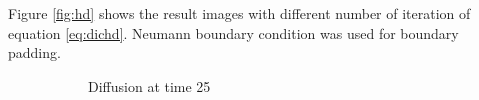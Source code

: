 \documentclass[paper=a4, fontsize=11pt]{scrartcl} %
\numberwithin{equation}{section} %
\numberwithin{figure}{section} %
\numberwithin{table}{section} %
\begin{document}
Figure \ref{fig:hd} shows the result images with different number of iteration of equation \ref{eq:dichd}. Neumann boundary condition was used for boundary padding.

\begin{figure}[H]
	\caption{Denoised image after diffusion\label{fig:hd}}
	\centering
	\begin{subfigure}[b]{0.45\textwidth}
		\noindent{}
	\caption{Diffusion at time 25}
	\end{subfigure}
	\hspace{5mm}
	\begin{subfigure}[b]{0.45\textwidth}
		\noindent{}
\end{subfigure}
\end{figure}
\end{document}
